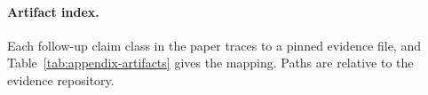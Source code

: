 
\paragraph{Artifact index.}
Each follow-up claim class in the paper traces to a pinned evidence file, and Table~\ref{tab:appendix-artifacts} gives the mapping. Paths are relative to the evidence repository.

